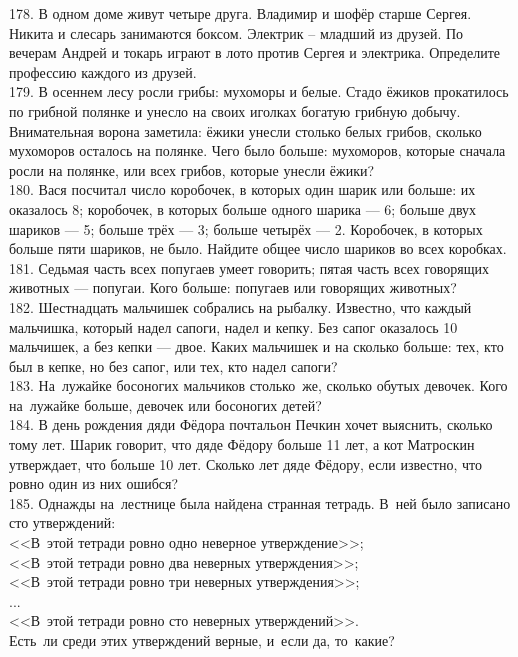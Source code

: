 178. В одном доме живут четыре друга. Владимир и шофёр старше Сергея. Никита и слесарь занимаются боксом. Электрик – младший из друзей. По вечерам Андрей и токарь играют в лото против Сергея и электрика. Определите профессию каждого из друзей.\\
179. В осеннем лесу росли грибы: мухоморы и белые. Стадо ёжиков прокатилось по грибной полянке и унесло на своих иголках богатую грибную добычу. Внимательная ворона заметила: ёжики унесли столько белых грибов, сколько мухоморов осталось на полянке. Чего было больше: мухоморов, которые сначала росли на полянке, или всех грибов, которые унесли ёжики?\\
180. Вася посчитал число коробочек, в которых один шарик или больше: их оказалось 8; коробочек, в которых больше одного шарика --- 6; больше двух шариков --- 5; больше трёх --- 3; больше четырёх --- 2. Коробочек, в которых больше пяти шариков, не было. Найдите общее число шариков во всех коробках.\\
181. Седьмая часть всех попугаев умеет говорить; пятая часть всех говорящих животных --- попугаи. Кого больше: попугаев или говорящих животных?\\
182. Шестнадцать мальчишек собрались на рыбалку. Известно, что каждый мальчишка, который надел сапоги, надел и кепку. Без сапог оказалось 10 мальчишек, а без кепки --- двое. Каких мальчишек и на сколько больше: тех, кто был в кепке, но без сапог, или тех, кто надел сапоги?\\
183. На лужайке босоногих мальчиков столько же, сколько обутых девочек. Кого на лужайке больше, девочек или босоногих детей?\\
184. В день рождения дяди Фёдора почтальон Печкин хочет выяснить, сколько тому лет. Шарик говорит, что дяде Фёдору больше 11 лет, а кот Матроскин утверждает, что больше 10 лет. Сколько лет дяде Фёдору, если известно, что ровно один из них ошибся?\\
185. Однажды на лестнице была найдена странная тетрадь. В ней было записано сто утверждений:\\
<<В этой тетради ровно одно неверное утверждение>>;\\
<<В этой тетради ровно два неверных утверждения>>;\\
<<В этой тетради ровно три неверных утверждения>>;\\
...\\
<<В этой тетради ровно сто неверных утверждений>>.\\
Есть ли среди этих утверждений верные, и если да, то какие?\\
